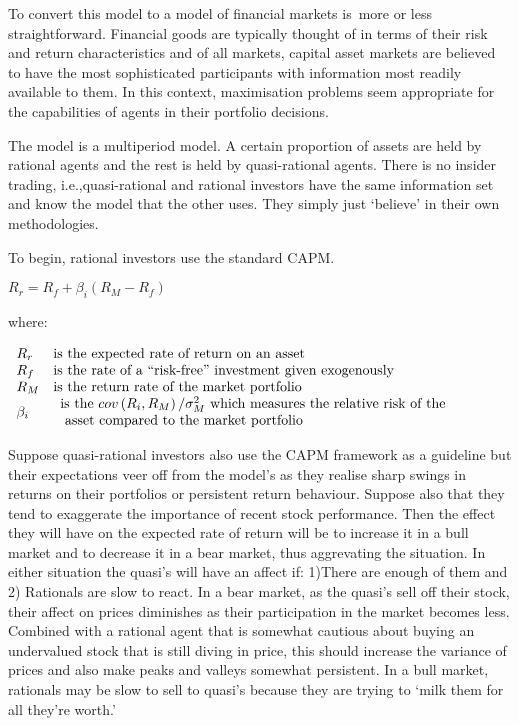 \documentclass{ucthesis}
\begin{document}
To convert this model to a model of financial markets is{\LARGE \ }more or
less straightforward. Financial goods are typically thought of in terms of
their risk and return characteristics and of all markets, capital asset
markets are believed to have the most sophisticated participants with
information most readily available to them. In this context, maximisation
problems seem appropriate for the capabilities of agents in their portfolio
decisions.

The model is a multiperiod model. A certain proportion of assets are held by
rational agents and the rest is held by quasi-rational agents. There is no
insider trading, i.e.,quasi-rational and rational investors have the same
information set and know the model that the other uses. They simply just
`believe' in their own methodologies.

To begin, rational investors use the standard CAPM.

$R_{r}=R_{f}+\beta _{i}\left( R_{M}-R_{f}\right) $

where:

$%
\begin{array}{ll}
R_{r} & \text{is the expected rate of return on an asset} \\ 
R_{f} & \text{is the rate of a \textquotedblleft
risk-free\textquotedblright\ investment given exogenously} \\ 
R_{M} & \text{is the return rate of the market portfolio} \\ 
\beta _{i} & 
\begin{array}{l}
\text{is the }cov\left( R_{i},R_{M}\right) /\sigma _{M}^{2}\text{ which
measures the relative risk of the} \\ 
\text{ asset compared to the market portfolio}%
\end{array}%
\end{array}%
$\bigskip

Suppose quasi-rational investors also use the CAPM framework as a guideline
but their expectations veer off from the model's as they realise sharp
swings in returns on their portfolios or persistent return behaviour.
Suppose also that they tend to exaggerate the importance of recent stock
performance. Then the effect they will have on the expected rate of return
will be to increase it in a bull market and to decrease it in a bear market,
thus aggrevating the situation. In either situation the quasi's will have an
affect if: 1)There are enough of them and 2) Rationals are slow to react. In
a bear market, as the quasi's sell off their stock, their affect on prices
diminishes as their participation in the market becomes less. Combined with
a rational agent that is somewhat cautious about buying an undervalued stock
that is still diving in price, this should increase the variance of prices
and also make peaks and valleys somewhat persistent. In a bull market,
rationals may be slow to sell to quasi's because they are trying to `milk
them for all they're worth.'
\end{document}
